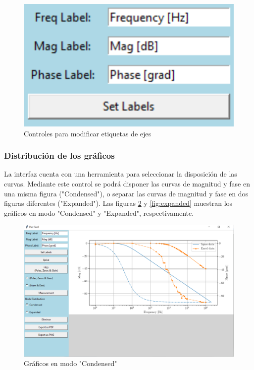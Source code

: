 \begin{figure}[ht]
\centering
\includegraphics[scale=0.3]{resources/labelsControl.png}
\caption{Controles para modificar etiquetas de ejes}
\label{fig:labesControl}
\end{figure}

\subsubsection{Distribución de los gráficos}
La interfaz cuenta con una herramienta para seleccionar la disposición de las curvas. Mediante este control se podrá disponer las curvas de magnitud y fase en una misma figura ("Condensed"), o separar las curvas de magnitud y fase en dos figuras diferentes ("Expanded"). Las figuras \ref{fig:condensed} y \ref{fig:expanded} muestran los gráficos en modo "Condensed" y "Expanded", respectivamente.

\begin{figure}[ht]
\centering
\includegraphics[scale=0.15]{resources/condensed.png}
\caption{Gráficos en modo "Condensed"}
\label{fig:condensed}
\end{figure}

